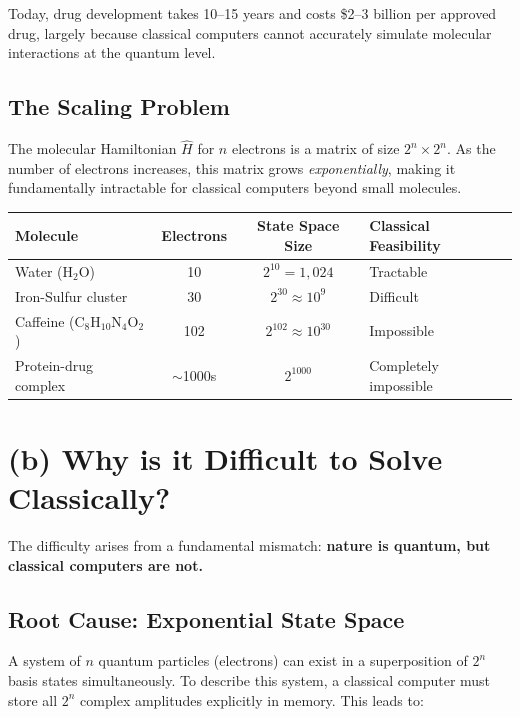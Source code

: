 \documentclass[11pt]{article}
\begin{document}
Today, drug development takes 10--15 years and costs \$2--3 billion per approved drug, largely because classical computers cannot accurately simulate molecular interactions at the quantum level.

\subsection*{The Scaling Problem}

The molecular Hamiltonian $\hat{H}$ for $n$ electrons is a matrix of size $2^n \times 2^n$. As the number of electrons increases, this matrix grows \textit{exponentially}, making it fundamentally intractable for classical computers beyond small molecules.

\begin{center}
\begin{tabular}{|l|c|c|l|}
\hline
\textbf{Molecule} & \textbf{Electrons} & \textbf{State Space Size} & \textbf{Classical Feasibility} \\
\hline
Water (H$_2$O) & 10 & $2^{10} = 1{,}024$ & Tractable \\
Iron-Sulfur cluster & 30 & $2^{30} \approx 10^{9}$ & Difficult \\
Caffeine (C$_8$H$_{10}$N$_4$O$_2$) & 102 & $2^{102} \approx 10^{30}$ & Impossible \\
Protein-drug complex & $\sim$1000s & $2^{1000}$ & Completely impossible \\
\hline
\end{tabular}
\end{center}

\section*{(b) Why is it Difficult to Solve Classically?}

The difficulty arises from a fundamental mismatch: \textbf{nature is quantum, but classical computers are not.}

\subsection*{Root Cause: Exponential State Space}

A system of $n$ quantum particles (electrons) can exist in a superposition of $2^n$ basis states simultaneously. To describe this system, a classical computer must store all $2^n$ complex amplitudes explicitly in memory. This leads to:
\end{document}
